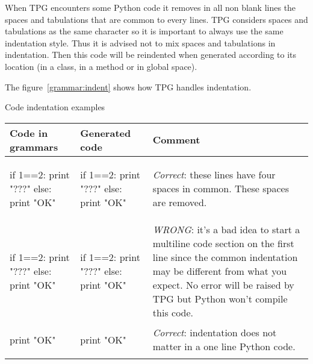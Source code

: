 When TPG encounters some Python code it removes in all non blank lines the spaces and tabulations that are common to every lines.
TPG considers spaces and tabulations as the same character so it is important to always use the same indentation style.
Thus it is advised not to mix spaces and tabulations in indentation.
Then this code will be reindented when generated according to its location (in a class, in a method or in global space).

The figure~\ref{grammar:indent} shows how TPG handles indentation.

\begin{tableau}
\caption{Code indentation examples}							\label{grammar:indent}
\begin{tabular}{| p{5cm} | p{4cm} | p{4cm} |}
\hline
	Code in grammars & Generated code & Comment \\
\hline
\hline

	\begin{verbatim*}
{{
    if 1==2:
        print "???"
    else:
        print "OK"
}}
	\end{verbatim*}
	&
	\begin{verbatim*}

if 1==2:
    print "???"
else:
    print "OK"
	\end{verbatim*}
	&
	\emph{Correct}: these lines have four spaces in common.  These spaces are removed.
	\\

\hline

	\begin{verbatim*}
{{  if 1==2:
        print "???"
    else:
        print "OK"
}}
	\end{verbatim*}
	&
	\begin{verbatim*}
if 1==2:
      print "???"
  else:
      print "OK"
	\end{verbatim*}
	&
	\emph{WRONG}: it's a bad idea to start a multiline code section on the first line since the common indentation may be different from what you expect.  No error will be raised by TPG but Python won't compile this code.
	\\

\hline

	\begin{verbatim*}
{{       print "OK" }}
	\end{verbatim*}
	&
	\begin{verbatim*}
print "OK"
	\end{verbatim*}
	&
	\emph{Correct}: indentation does not matter in a one line Python code.
	\\

\hline

\end{tabular}
\end{tableau}

